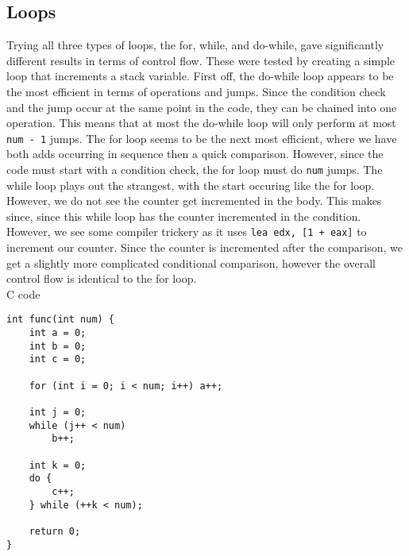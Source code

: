 \documentclass[11pt]{article}
\begin{document}
\subsection*{Loops}
Trying all three types of loops, the for, while, and do-while, gave significantly different results in terms of control flow. These were tested by creating a simple loop that increments a stack variable. First off, the do-while loop appears to be the most efficient in terms of operations and jumps. Since the condition check and the jump occur at the same point in the code, they can be chained into one operation. This means that at most the do-while loop will only perform at most \texttt{num - 1} jumps. The for loop seems to be the next most efficient, where we have both adds occurring in sequence then a quick comparison. However, since the code must start with a condition check, the for loop must do \texttt{num} jumps. The while loop plays out the strangest, with the start occuring like the for loop. However, we do not see the counter get incremented in the body. This makes since, since this while loop has the counter incremented in the condition. However, we see some compiler trickery as it uses \texttt{lea edx, [1 + eax]} to increment our counter. Since the counter is incremented after the comparison, we get a slightly more complicated conditional comparison, however the overall control flow is identical to the for loop. \\


C code
\begin{lstlisting}
int func(int num) {
    int a = 0;
    int b = 0;
    int c = 0;

    for (int i = 0; i < num; i++) a++;

    int j = 0;
    while (j++ < num)
        b++;

    int k = 0;
    do {
        c++;
    } while (++k < num);

    return 0;
}
\end{lstlisting}
\end{document}
